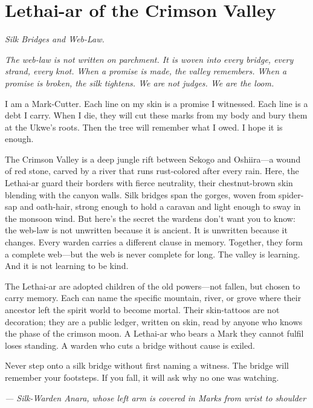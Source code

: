 \newpage

\newpage

\chapter{Lethai-ar of the Crimson Valley}
\emph{Silk Bridges and Web-Law.}

\noindent
{\Large
\textit{The web-law is not written on parchment. It is woven into every bridge, every strand, every knot. When a promise is made, the valley remembers. When a promise is broken, the silk tightens. We are not judges. We are the loom.}

\vspace{0.5em}

I am a Mark-Cutter. Each line on my skin is a promise I witnessed. Each line is a debt I carry. When I die, they will cut these marks from my body and bury them at the Ukwe's roots. Then the tree will remember what I owed. I hope it is enough.

\vspace{0.5em}

The Crimson Valley is a deep jungle rift between Sekogo and Oshiira---a wound of red stone, carved by a river that runs rust-colored after every rain. Here, the Lethai-ar guard their borders with fierce neutrality, their chestnut-brown skin blending with the canyon walls. Silk bridges span the gorges, woven from spider-sap and oath-hair, strong enough to hold a caravan and light enough to sway in the monsoon wind. But here's the secret the wardens don't want you to know: the web-law is not unwritten because it is ancient. It is unwritten because it changes. Every warden carries a different clause in memory. Together, they form a complete web---but the web is never complete for long. The valley is learning. And it is not learning to be kind.

\vspace{0.5em}

The Lethai-ar are adopted children of the old powers---not fallen, but chosen to carry memory. Each can name the specific mountain, river, or grove where their ancestor left the spirit world to become mortal. Their skin-tattoos are not decoration; they are a public ledger, written on skin, read by anyone who knows the phase of the crimson moon. A Lethai-ar who bears a Mark they cannot fulfil loses standing. A warden who cuts a bridge without cause is exiled.

\vspace{0.5em}

Never step onto a silk bridge without first naming a witness. The bridge will remember your footsteps. If you fall, it will ask why no one was watching.

\vspace{1em}

\noindent\textit{--- Silk-Warden Anara, whose left arm is covered in Marks from wrist to shoulder}
}

